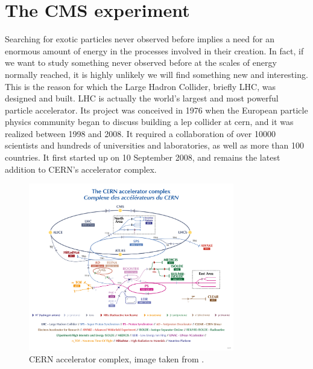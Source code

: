 \documentclass[../../main.tex]{subfiles}
\begin{document}
\chapter{The CMS experiment}
\label{sec:CMS_exp}

Searching for exotic particles never observed before implies a need for an enormous amount of energy in the processes involved in their creation. In fact, if we want to study something never observed before at the scales of energy normally reached, it is highly unlikely we will find something new and interesting. This is the reason for which the Large Hadron Collider, briefly LHC, was designed and built. LHC is actually the world’s largest and most powerful particle accelerator. Its project was conceived in 1976 when the European particle physics community began to discuss building a \acrfull{lep} collider at \acrshort{cern}, and it was realized between 1998 and 2008. It required a collaboration of over 10000 scientists and hundreds of universities and laboratories, as well as more than 100 countries. It first started up on 10 September 2008, and remains the latest addition to CERN’s accelerator complex.

\begin{figure}[h]
    \centering
    \includegraphics[width=0.8\textwidth]{sections/01/Images/Cern_acc_complex.png}
    \caption{CERN accelerator complex, image taken from \cite{LHC-Acc}.}
    \label{fig:CERN_ACC}
\end{figure}  
    
\end{document}
